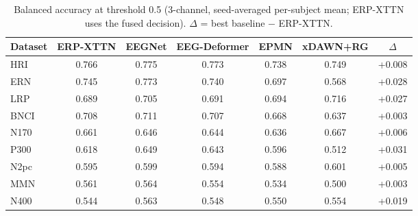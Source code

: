 \begin{table}[t]
\centering
\setlength{\tabcolsep}{5pt}
\caption{Balanced accuracy at threshold 0.5 (3-channel, seed-averaged per-subject mean; ERP-XTTN uses the fused decision). $\Delta$ = best baseline $-$ ERP-XTTN.}
\label{tab:balacc}
\begin{tabular}{lcccccc}
\toprule
Dataset & ERP-XTTN & EEGNet & EEG-Deformer & EPMN & xDAWN+RG & $\Delta$ \\
\midrule
HRI & 0.766 & 0.775 & 0.773 & 0.738 & 0.749 & +0.008 \\
ERN & 0.745 & 0.773 & 0.740 & 0.697 & 0.568 & +0.028 \\
LRP & 0.689 & 0.705 & 0.691 & 0.694 & 0.716 & +0.027 \\
BNCI & 0.708 & 0.711 & 0.707 & 0.668 & 0.637 & +0.003 \\
N170 & 0.661 & 0.646 & 0.644 & 0.636 & 0.667 & +0.006 \\
P300 & 0.618 & 0.649 & 0.643 & 0.596 & 0.512 & +0.031 \\
N2pc & 0.595 & 0.599 & 0.594 & 0.588 & 0.601 & +0.005 \\
MMN & 0.561 & 0.564 & 0.554 & 0.534 & 0.500 & +0.003 \\
N400 & 0.544 & 0.563 & 0.548 & 0.550 & 0.554 & +0.019 \\
\bottomrule
\end{tabular}
\end{table}
